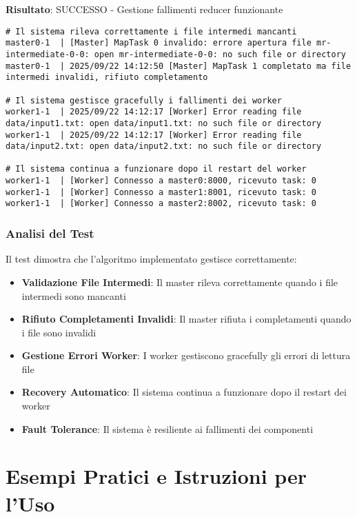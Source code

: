 \documentclass[12pt,a4paper]{article}
\begin{document}
\textbf{Risultato}: SUCCESSO - Gestione fallimenti reducer funzionante
\begin{lstlisting}
# Il sistema rileva correttamente i file intermedi mancanti
master0-1  | [Master] MapTask 0 invalido: errore apertura file mr-intermediate-0-0: open mr-intermediate-0-0: no such file or directory        
master0-1  | 2025/09/22 14:12:50 [Master] MapTask 1 completato ma file intermedi invalidi, rifiuto completamento

# Il sistema gestisce gracefully i fallimenti dei worker
worker1-1  | 2025/09/22 14:12:17 [Worker] Error reading file data/input1.txt: open data/input1.txt: no such file or directory
worker1-1  | 2025/09/22 14:12:17 [Worker] Error reading file data/input2.txt: open data/input2.txt: no such file or directory

# Il sistema continua a funzionare dopo il restart del worker
worker1-1  | [Worker] Connesso a master0:8000, ricevuto task: 0
worker1-1  | [Worker] Connesso a master1:8001, ricevuto task: 0
worker1-1  | [Worker] Connesso a master2:8002, ricevuto task: 0
\end{lstlisting}

\subsubsection{Analisi del Test}

Il test dimostra che l'algoritmo implementato gestisce correttamente:

\begin{itemize}
\item \textbf{Validazione File Intermedi}: Il master rileva correttamente quando i file intermedi sono mancanti
\item \textbf{Rifiuto Completamenti Invalidi}: Il master rifiuta i completamenti quando i file sono invalidi
\item \textbf{Gestione Errori Worker}: I worker gestiscono gracefully gli errori di lettura file
\item \textbf{Recovery Automatico}: Il sistema continua a funzionare dopo il restart dei worker
\item \textbf{Fault Tolerance}: Il sistema è resiliente ai fallimenti dei componenti
\end{itemize}

\section{Esempi Pratici e Istruzioni per l'Uso}
\end{document}
